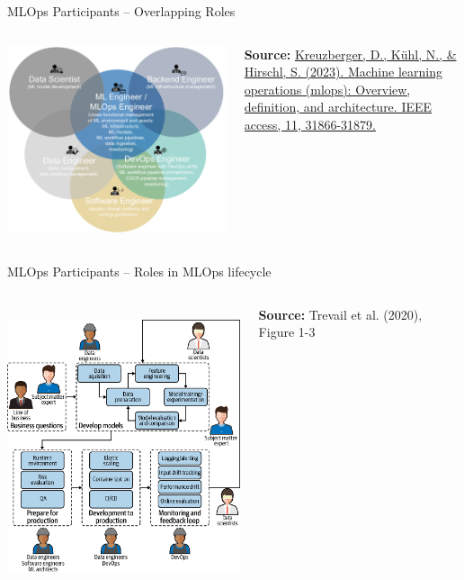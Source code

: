 \documentclass[ignorenonframetext,xcolor=x11names]{beamer}
\begin{document}
\begin{frame}{MLOps Participants -- Overlapping Roles}
\begin{columns}
\begin{column}{.9\textwidth}
\centering
\includegraphics[width=\textwidth]{Kreuzbergeretal_fig3.png} 
\end{column}
\begin{column}{.15\textwidth}
\tiny \textbf{Source:} \href{https://ieeexplore.ieee.org/abstract/document/10081336}{Kreuzberger, D., K\"uhl, N., \& Hirschl, S. (2023). Machine learning operations (mlops): Overview, definition, and architecture. IEEE access, 11, 31866-31879.}
\end{column}
\end{columns}
\end{frame}

\begin{frame}{MLOps Participants -- Roles in MLOps lifecycle}
\begin{columns}
\begin{column}{.8\textwidth}
\centering
\includegraphics[height=3.25in]{imlo_0103.png}
\end{column}
\begin{column}{.2\textwidth}
\tiny \textbf{Source:} Trevail et al. (2020), Figure 1-3
\end{column}
\end{columns}
\end{frame}
\end{document}

